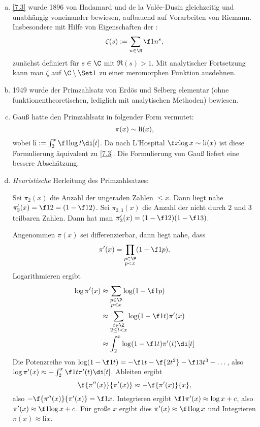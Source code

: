 \begin{nt} \label{7.4}
	\begin{enumerate}[a)]
		\item
			\ref{7.3} wurde 1896 von Hadamard und de la Valée-Dusin gleichzeitig und unabhängig voneinander bewiesen, aufbauend auf Vorarbeiten von Riemann.
			Insbesondere mit Hilfe von Eigenschaften der :
			\[
				\zeta(s) := \sum_{n\in \N} \f 1{n^s},
			\]
			zunächst definiert für $s \in \C$ mit $\Re(s) > 1$.
			Mit analytischer Fortsetzung kann man $\zeta$ auf $\C \setminus \Set 1$ zu einer meromorphen Funktion ausdehnen.
		\item
			1949 wurde der Primzahlsatz von Erdös und Selberg elementar (ohne funktionentheoretischen, lediglich mit analytischen Methoden) bewiesen.
		\item
			Gauß hatte den Primzahlsatz in folgender Form vermutet:
			\[
				\pi(x) \sim \operatorname{li}(x),
			\]
			wobei $\li := \int_{2}^x \f 1{\log t} \di[t]$.
			Da nach L'Hospital $\f x{\log x} \sim \li(x)$ ist diese Formulierung äquivalent zu \ref{7.3}.
			Die Formulierung von Gauß liefert eine bessere Abschätzung.
		\item
			\emph{Heuristische} Herleitung des Primzahlsatzes:

			Sei $\pi_2(x)$ die Anzahl der ungeraden Zahlen $\le x$.
			Dann liegt nahe $\pi_2'(x) = \f 12 = (1 - \f 12)$.
			Sei $\pi_{2,3}(x)$ die Anzahl der nicht durch $2$ und $3$ teilbaren Zahlen.
			Dann hat man $\pi_3'(x) = (1 - \f 12)(1 - \f 13)$.

			Angenommen $\pi(x)$ sei differenzierbar, dann liegt nahe, dass
			\[
				\pi'(x) = \prod_{\substack{p\in \P \\ p < x}} (1 - \f 1p).
			\]
			Logarithmieren ergibt
			\begin{align*}
				\log \pi'(x) &\approx \sum_{\substack{p \in \P \\ p < x}} \log(1 - \f 1p) \\
				&\approx \sum_{\substack{t \in \Z \\ 2 \le t < x}} \log(1 - \f 1t) \pi'(x) \\
				&\approx \int_2^x \log(1 - \f 1t) \pi'(t) \di[t] 
			\end{align*}
			Die Potenzreihe von $\log(1 - \f 1t) = - \f 1t - \f {2t^2} - \f 1{3t^3} - \dotsc$, also $\log \pi'(x) \approx -\int_2^x \f 1t \pi'(t) \di[t]$.
			Ableiten ergibt
			\[
				\f{\pi''(x)}{\pi'(x)} \approx - \f{\pi'(x)}{x},
			\]
			also $- \f{\pi''(x)}{\pi'(x)} = \f 1{x}$.
			Integrieren ergibt $\f 1{\pi'(x)} \approx \log x + c$, also $\pi'(x) \approx \f 1{\log x + c}$.
			Für große $x$ ergibt dies $\pi'(x) \approx \f 1{\log x}$ und Integrieren $\pi(x) \approx \mathrm{li} x$.
	\end{enumerate}
\end{nt}

